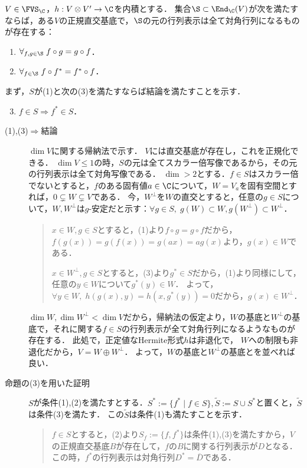 \documentclass[uplatex,dvipdfmx]{jsarticle}
\begin{document}
\begin{theorem}
    $V\in\FVS_\C$，$h:V\otimes V'\to\C$を内積とする．
    集合$\S\subset\End_\C(V)$が次を満たすならば，ある$V$の正規直交基底で，$\S$の元の行列表示は全て対角行列になるものが存在する：
    \begin{enumerate}
        \item $\forall_{f,g\in\S}\;f\circ g=g\circ f$．
        \item $\forall_{f\in\S}\;f\circ f^*=f^*\circ f$．
    \end{enumerate}
\end{theorem}
\begin{Proof}まず，$S$が(1)と次の(3)を満たすならば結論を満たすことを示す．
    \begin{enumerate}[(1)]\setcounter{enumi}{2}
        \item $f\in S\Rightarrow f^*\in S$．
    \end{enumerate}
    \begin{description}
        \item[(1),(3)$\Rightarrow$結論] 
        $\dim V$に関する帰納法で示す．
        $V$には直交基底が存在し，これを正規化できる．
        $\dim V\le 1$の時，$S$の元は全てスカラー倍写像であるから，その元の行列表示は全て対角写像である．
        $\dim >2$とする．$f\in S$はスカラー倍でないとすると，$f$のある固有値$a\in\C$について，$W=V_a$を固有空間とすれば，$0\subsetneq W\subsetneq V$である．
        今，$W^\perp$を$W$の直交とすると，任意の$g\in S$について，$W,W^\perp$は$g$-安定だと示す：$\forall g\in S,\;g(W)\subset W,g(W^\perp)\subset W^\perp$．
        \begin{quotation}
            $x\in W,g\in S$とすると，(1)より$f\circ g=g\circ f$だから，$f(g(x))=g(f(x))=g(ax)=ag(x)$より，$g(x)\in W$である．

            $x\in W^\perp,g\in S$とすると，(3)より$g^*\in S$だから，(1)より同様にして，任意の$y\in W$について$g^*(y)\in W$．
            よって，$\forall y\in W,\;h(g(x),y)=h(x,g^*(y))=0$だから，$g(x)\in W^\perp$．
        \end{quotation}
        $\dim W,\dim W^\perp<\dim V$だから，帰納法の仮定より，$W$の基底と$W^\perp$の基底で，それに関する$f\in S$の行列表示が全て対角行列になるようなものが存在する．
        此処で，正定値なHermite形式$h$は非退化で，
        $W$への制限も非退化だから，$V=W\oplus W^\perp$．
        よって，$W$の基底と$W^\perp$の基底とを並べれば良い．
        \item[命題の(3)を用いた証明]
        $S$が条件(1),(2)を満たすとする．$S^*:=\{f^*\mid f\in S\},\tilde{S}:=S\cup S^*$と置くと，$\tilde{S}$は条件(3)を満たす．
        この$\tilde{S}$は条件(1)も満たすことを示す．
        \begin{quotation}
            $f\in S$とすると，(2)より$S_f:=\{f,f^*\}$は条件(1),(3)を満たすから，$V$の正規直交基底$B$が存在して，$f$の$B$に関する行列表示が$D$となる．
            この時，$f^*$の行列表示は対角行列$D^*=\overline{D}$である．


\end{quotation}
\end{description}
\end{Proof}
\end{document}
